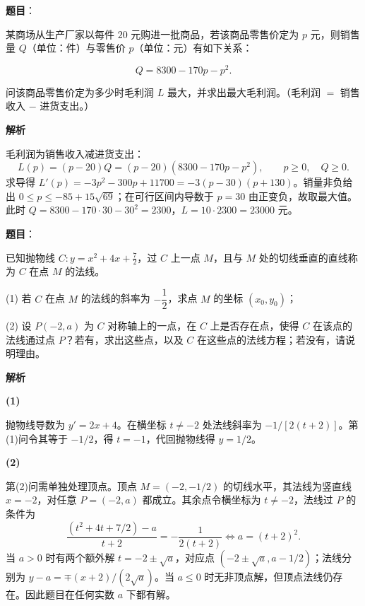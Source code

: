 \begin{answer}

\textbf{题目}：

某商场从生产厂家以每件 $20$ 元购进一批商品，若该商品零售价定为 $p$ 元，则销售量 $Q$（单位：件）与零售价 $p$（单位：元）有如下关系：

\nopagebreak[4]
\[
Q=8300-170p-p^2.
\]

问该商品零售价定为多少时毛利润 $L$ 最大，并求出最大毛利润。（毛利润 $=$ 销售收入 $-$ 进货支出。）

\textbf{解析}

毛利润为销售收入减进货支出：
\nopagebreak[4]
\[
L(p)=(p-20)Q=(p-20)(8300-170p-p^2),\qquad p\ge0,\quad Q\ge0.
\]
求导得 $L'(p)=-3p^2-300p+11700=-3(p-30)(p+130)$。销量非负给出 $0\le p\le-85+15\sqrt{69}$；在可行区间内导数于 $p=30$ 由正变负，故取最大值。此时 $Q=8300-170\cdot30-30^2=2300$，$L=10\cdot2300=23000$ 元。


\end{answer}
\begin{answer}

\textbf{题目}：

已知抛物线 $C:y=x^2+4x+\frac{7}{2}$，过 $C$ 上一点 $M$，且与 $M$ 处的切线垂直的直线称为 $C$ 在点 $M$ 的法线。

(1) 若 $C$ 在点 $M$ 的法线的斜率为 $-\dfrac{1}{2}$，求点 $M$ 的坐标 $(x_0,y_0)$；

(2) 设 $P(-2,a)$ 为 $C$ 对称轴上的一点，在 $C$ 上是否存在点，使得 $C$ 在该点的法线通过点 $P$？若有，求出这些点，以及 $C$ 在这些点的法线方程；若没有，请说明理由。

\textbf{解析}

\textbf{(1)}

抛物线导数为 $y'=2x+4$。在横坐标 $t\ne-2$ 处法线斜率为 $-1/[2(t+2)]$。第(1)问令其等于 $-1/2$，得 $t=-1$，代回抛物线得 $y=1/2$。

\textbf{(2)}

第(2)问需单独处理顶点。顶点 $M=(-2,-1/2)$ 的切线水平，其法线为竖直线 $x=-2$，对任意 $P=(-2,a)$ 都成立。其余点令横坐标为 $t\ne-2$，法线过 $P$ 的条件为
\nopagebreak[4]
\[
\frac{(t^2+4t+7/2)-a}{t+2}=-\frac1{2(t+2)}
\iff a=(t+2)^2.
\]
当 $a>0$ 时有两个额外解 $t=-2\pm\sqrt a$，对应点 $(-2\pm\sqrt a,a-1/2)$；法线分别为 $y-a=\mp(x+2)/(2\sqrt a)$。当 $a\le0$ 时无非顶点解，但顶点法线仍存在。因此题目在任何实数 $a$ 下都有解。



\end{answer}